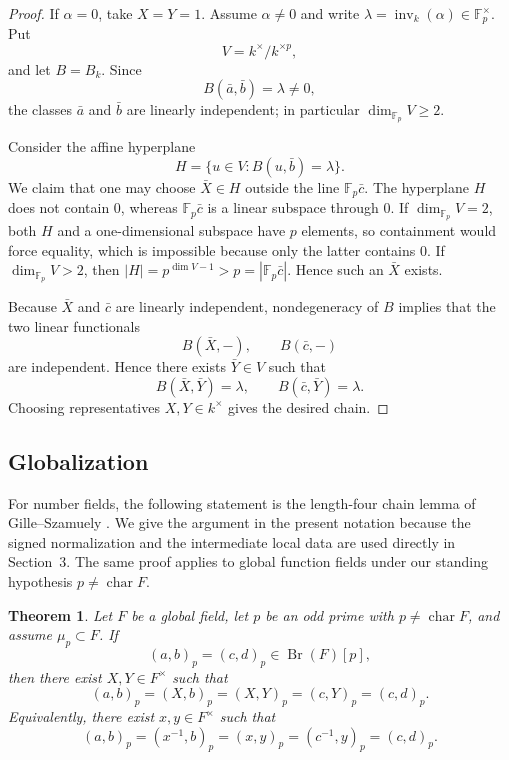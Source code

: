\documentclass[12pt]{amsart}
\newtheorem{theorem}{Theorem}[section]
\theoremstyle{definition}
\theoremstyle{remark}
\DeclareMathOperator{\Br}{Br}
\DeclareMathOperator{\inv}{inv}
\newcommand{\Fp}{\mathbb F_p}
\begin{document}
\begin{proof}
If $\alpha=0$, take $X=Y=1$. Assume $\alpha\neq0$ and write
$\lambda=\inv_k(\alpha)\in\Fp^\times$. Put
\[
 V=k^\times/k^{\times p},
\]
and let $B=B_k$. Since
\[
 B(\bar a,\bar b)=\lambda\neq0,
\]
the classes $\bar a$ and $\bar b$ are linearly independent; in particular
$\dim_{\Fp}V\ge2$.

Consider the affine hyperplane
\[
 H=\{u\in V:B(u,\bar b)=\lambda\}.
\]
We claim that one may choose $\bar X\in H$ outside the line
$\Fp\bar c$. The hyperplane $H$ does not contain $0$, whereas
$\Fp\bar c$ is a linear subspace through $0$. If $\dim_{\Fp}V=2$, both
$H$ and a one-dimensional subspace have $p$ elements, so containment would
force equality, which is impossible because only the latter contains $0$.
If $\dim_{\Fp}V>2$, then $|H|=p^{\dim V-1}>p=|\Fp\bar c|$. Hence such an
$\bar X$ exists.

Because $\bar X$ and $\bar c$ are linearly independent, nondegeneracy of
$B$ implies that the two linear functionals
\[
 B(\bar X,-),\qquad B(\bar c,-)
\]
are independent. Hence there exists $\bar Y\in V$ such that
\[
 B(\bar X,\bar Y)=\lambda,
 \qquad
 B(\bar c,\bar Y)=\lambda.
\]
Choosing representatives $X,Y\in k^\times$ gives the desired chain.
\end{proof}

\subsection{Globalization}

For number fields, the following statement is the length-four chain lemma of
Gille--Szamuely \cite[Lemma~7.6.11]{GilleSzamuely}. We give the argument in
the present notation because the signed normalization and the intermediate
local data are used directly in Section~3. The same proof applies to global
function fields under our standing hypothesis $p\neq\operatorname{char}F$.

\begin{theorem}\label{thm:global-chain}
Let $F$ be a global field, let $p$ be an odd prime with
$p\neq\operatorname{char}F$, and assume $\mu_p\subset F$. If
\[
 (a,b)_p=(c,d)_p\in\Br(F)[p],
\]
then there exist $X,Y\in F^\times$ such that
\begin{equation}\label{eq:ordinary-chain}
 (a,b)_p=(X,b)_p=(X,Y)_p=(c,Y)_p=(c,d)_p.
\end{equation}
Equivalently, there exist $x,y\in F^\times$ such that
\begin{equation}\label{eq:signed-chain}
 (a,b)_p=(x^{-1},b)_p=(x,y)_p=(c^{-1},y)_p=(c,d)_p.
\end{equation}
\end{theorem}
\end{document}
